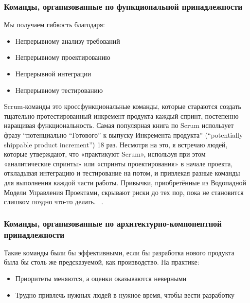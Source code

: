 \documentclass{../industrial-development}
\begin{document}

\begin{frame} \frametitle{Команды, организованные по функциональной принадлежности}
		Мы получаем гибкость благодаря:
		\begin{itemize}
		\item Непрерывному анализу требований 
		\item Непрерывному проектированию
		\item Непрерывной интеграции 
		\item Непрерывному тестированию
\end{itemize}
\end{frame}

\lecturenotes
Scrum‐команды это кроссфункциональные команды, которые стараются создать тщательно протестированный инкремент продукта каждый спринт, постепенно наращивая функциональность. Самая популярная книга по Scrum использует фразу “потенциально “Готового” к выпуску Инкремента продукта” (“potentially shippable product increment”) 18 раз. Несмотря на это, я встречаю людей, которые утверждают, что «практикуют Scrum», используя при этом «аналитические спринты» или «спринты проектирования» в начале проекта, откладывая интеграцию и тестирование на потом, и привлекая разные команды для выполнения каждой части работы. Привычки, приобретённые из Водопадной Модели Управления Проектами, скрывают риски до тех пор, пока не становится слишком поздно что-то делать. 
~\cite{Fowler}.


\begin{frame} \frametitle{Команды, организованные по архитектурно-компонентной принадлежности}
		Такие команды были бы эффективными, если бы разработка нового продукта была бы столь же предсказуемой, как производство.\newline
		На практике:
		\begin{itemize}
		\item Приоритеты меняются, а оценки оказываются неверными 
		\item Трудно привлечь нужных людей в нужное время, чтобы вести разработку 
\end{itemize}
\end{frame}
\end{document}
